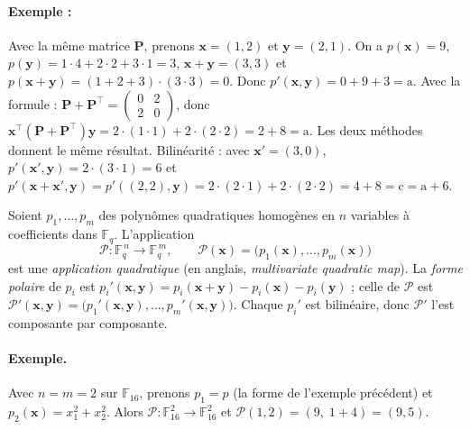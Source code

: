 \paragraph{Exemple :} Avec la même matrice $\mathbf{P}$, prenons $\mathbf{x}=(1,2)$ et $\mathbf{y}=(2,1)$. On a $p(\mathbf{x})=9$, $p(\mathbf{y})=1\cdot4+2\cdot2+3\cdot1=3$, $\mathbf{x}+\mathbf{y}=(3,3)$ et $p(\mathbf{x}+\mathbf{y})=(1+2+3)\cdot(3\cdot3)=0$. Donc $p'(\mathbf{x},\mathbf{y})=0+9+3=\mathrm{a}$. Avec la formule : $\mathbf{P}+\mathbf{P}^{\top}=\begin{pmatrix}0&2\\2&0\end{pmatrix}$, donc $\mathbf{x}^{\top}(\mathbf{P}+\mathbf{P}^{\top})\mathbf{y}=2\cdot(1\cdot1)+2\cdot(2\cdot2)=2+8=\mathrm{a}$. Les deux méthodes donnent le même résultat. Bilinéarité : avec $\mathbf{x}'=(3,0)$, $p'(\mathbf{x}',\mathbf{y})=2\cdot(3\cdot1)=6$ et $p'(\mathbf{x}+\mathbf{x}',\mathbf{y})=p'((2,2),\mathbf{y})=2\cdot(2\cdot1)+2\cdot(2\cdot2)=4+8=\mathrm{c}=\mathrm{a}+6$.

\begin{definition}
Soient $p_1,\dots,p_m$ des polynômes quadratiques homogènes en $n$ variables à coefficients dans $\mathbb{F}_q$. L'application
\[\mathcal{P}:\mathbb{F}_q^{\,n}\longrightarrow\mathbb{F}_q^{\,m},\qquad \mathcal{P}(\mathbf{x})=\bigl(p_1(\mathbf{x}),\dots,p_m(\mathbf{x})\bigr)\]
est une \emph{application quadratique} (en anglais, \emph{multivariate quadratic map}). La \emph{forme polaire} de $p_i$ est $p_i'(\mathbf{x},\mathbf{y})=p_i(\mathbf{x}+\mathbf{y})-p_i(\mathbf{x})-p_i(\mathbf{y})$ ; celle de $\mathcal{P}$ est $\mathcal{P}'(\mathbf{x},\mathbf{y})=\bigl(p_1'(\mathbf{x},\mathbf{y}),\dots,p_m'(\mathbf{x},\mathbf{y})\bigr)$. Chaque $p_i'$ est bilinéaire, donc $\mathcal{P}'$ l'est composante par composante.
\end{definition}

\paragraph{Exemple.} Avec $n=m=2$ sur $\mathbb{F}_{16}$, prenons $p_1=p$ (la forme de l'exemple précédent) et $p_2(\mathbf{x})=x_1^2+x_2^2$. Alors $\mathcal{P}:\mathbb{F}_{16}^2\to\mathbb{F}_{16}^2$ et $\mathcal{P}(1,2)=(9,\;1+4)=(9,5)$.

